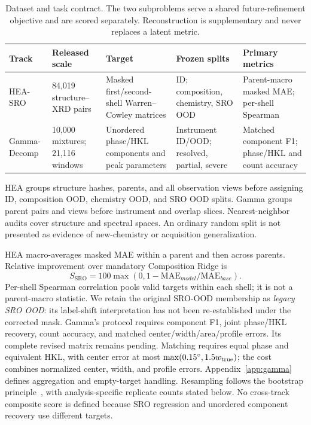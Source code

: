 \documentclass[sigconf,review,anonymous]{acmart}
\newenvironment{revision}{\ifdefined\markedcopy\color{red!70!black}\else\color{black}\fi}{}
\begin{document}
\begin{table}[t]
  \caption{Dataset and task contract. The two subproblems serve a shared
  future-refinement objective and are scored separately.
  Reconstruction is supplementary and never replaces
  a latent metric.}
  \label{tab:contract}
  \scriptsize\setlength{\tabcolsep}{3pt}
  \begin{tabular}{p{}p{}p{}p{}p{}}
    \toprule Track & Released scale & Target & Frozen splits & Primary metrics \\
    \midrule
    HEA-SRO & 84,019 structure--XRD pairs & Masked first/second-shell Warren--Cowley matrices & ID; composition, chemistry, SRO OOD & Parent-macro masked MAE; per-shell Spearman \\
    Gamma-Decomp & 10,000 mixtures; 21,116 windows & Unordered phase/HKL components and peak parameters & Instrument ID/OOD; resolved, partial, severe & Matched component F1; phase/HKL and count accuracy \\
    \bottomrule
  \end{tabular}
\end{table}

HEA groups structure hashes, parents, and all observation views before assigning
ID, composition OOD, chemistry OOD, and SRO OOD splits. Gamma groups parent
pairs and views before instrument and overlap slices. Nearest-neighbor audits
cover structure and spectral spaces. An ordinary random split is not presented
as evidence of new-chemistry or acquisition generalization.

HEA macro-averages masked MAE within a parent and then across parents. Relative
improvement over mandatory Composition Ridge is
\begin{equation}
S_{\mathrm{SRO}}=100\max(0,1-\mathrm{MAE}_{model}/\mathrm{MAE}_{base}).
\end{equation}
\begin{revision}
Per-shell Spearman correlation pools valid targets within each shell; it is
not a parent-macro statistic. We retain the original SRO-OOD membership as
\emph{legacy SRO OOD}: its label-shift interpretation has not been
re-established under the corrected mask.
Gamma's protocol requires component F1, joint phase/HKL recovery, count
accuracy, and matched center/width/area/profile errors. Its complete revised
matrix remains pending. Matching requires equal phase and equivalent HKL,
with center error at most $\max(0.15^\circ,1.5w_{\rm true})$; the cost
combines normalized center, width, and profile errors. Appendix~\ref{app:gamma}
defines aggregation and empty-target handling. Resampling follows the
bootstrap principle~\cite{efron1994bootstrap}, with analysis-specific
replicate counts stated below. No cross-track composite score is defined
because SRO regression and unordered component recovery use different targets.
\end{revision}
\end{document}
